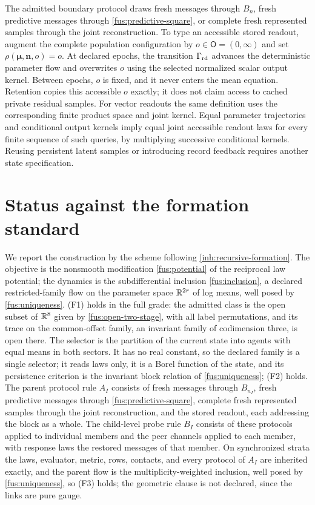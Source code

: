 The admitted boundary protocol draws fresh messages through $B_n$, fresh
predictive messages through \cref{fus:predictive-square}, or complete
fresh represented samples through the joint reconstruction. To type an
accessible stored readout, augment the complete population configuration by
$o\in\mathsf O=(0,\infty)$ and set $\rho(\boldsymbol\mu,\boldsymbol n,o)=o$.
At declared epochs, the transition $\Gamma_{\rm rd}$ advances the
deterministic parameter flow and overwrites $o$ using the selected normalized
scalar output kernel. Between epochs, $o$ is fixed, and it never enters the
mean equation. Retention copies this accessible $o$ exactly; it does not
claim access to cached private residual samples. For vector readouts the same
definition uses the corresponding finite product space and joint kernel.
Equal parameter trajectories and conditional output kernels imply equal
joint accessible readout laws for every finite sequence of such queries,
by multiplying successive conditional kernels. Reusing persistent latent
samples or introducing record feedback requires another state specification.

\section{Status against the formation standard}
\label{sec:fus-status}

We report the construction by the scheme following
\cref{inh:recursive-formation}. The objective is the nonsmooth modification
\cref{fus:potential} of the reciprocal law potential; the dynamics is the
subdifferential inclusion \cref{fus:inclusion}, a declared restricted-family
flow on the parameter space $\mathbb R^{2r}$ of log means, well posed by
\cref{fus:uniqueness}. (F1) holds in the full grade: the admitted class is
the open subset of $\mathbb R^8$ given by \cref{fus:open-two-stage}, with all label
permutations, and its trace on the common-offset family, an invariant family
of codimension three, is open there. The selector is the partition of the
current state into agents with equal means in both sectors. It has no real
constant, so the declared family is a single selector; it reads laws only,
it is a Borel function of the state, and its persistence criterion is the
invariant block relation of \cref{fus:uniqueness}; (F2) holds. The parent
protocol rule $A_I$ consists of fresh messages through $B_{n_I}$, fresh
predictive messages through \cref{fus:predictive-square}, complete fresh
represented samples through the joint reconstruction, and the stored readout,
each addressing the block as a whole. The child-level probe rule $B_I$
consists of these protocols applied to individual members and the peer
channels applied to each member, with response laws the restored messages
of that member. On synchronized strata the laws, evaluator, metric, rows,
contacts, and every protocol of $A_I$ are inherited exactly, and the parent
flow is the multiplicity-weighted inclusion, well posed by
\cref{fus:uniqueness}, so (F3) holds; the geometric clause is not declared,
since the links are pure gauge.


